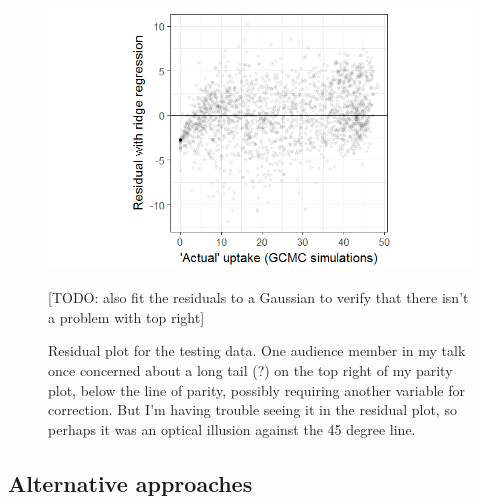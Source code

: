 \documentclass[letterpaper]{article}
\begin{document}
\begin{figure}[H]
	\centering
	\includegraphics[width=0.75\columnwidth]{Figs/residual.png}
	\caption{Residual plot for the testing data.  One audience member in my talk once concerned about a long tail (?) on the top right of my parity plot, below the line of parity, possibly requiring another variable for correction.  But I'm having trouble seeing it in the residual plot, so perhaps it was an optical illusion against the 45 degree line.}
	\label{fig:test_residual}

[TODO: also fit the residuals to a Gaussian to verify that there isn't a problem with top right]

\end{figure}


\subsection{Alternative approaches}
\end{document}
